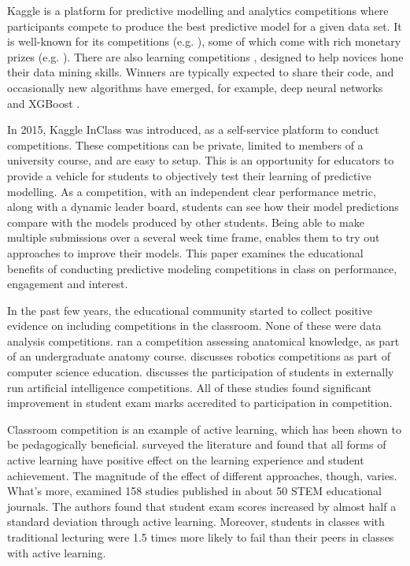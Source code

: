 \documentclass[12pt]{article}
\begin{document}
Kaggle \citep{kaggle} is a platform for predictive modelling and
analytics competitions where participants compete to produce the best
predictive model for a given data set. It is well-known for its
competitions (e.g. \citet{darkmatter}), some of which come with rich
monetary prizes (e.g. \citet{heritage}). There are also learning
competitions \citep{kagglelearn}, designed to help novices hone their
data mining skills. Winners are typically expected to share their code,
and occasionally new algorithms have emerged, for example, deep neural
networks \citep{HintonDahi12} and XGBoost \citep{ChenXGBoost}.

In 2015, Kaggle InClass was introduced, as a self-service platform to
conduct competitions. These competitions can be private, limited to
members of a university course, and are easy to setup. This is an
opportunity for educators to provide a vehicle for students to
objectively test their learning of predictive modelling. As a
competition, with an independent clear performance metric, along with a
dynamic leader board, students can see how their model predictions
compare with the models produced by other students. Being able to make
multiple submissions over a several week time frame, enables them to try
out approaches to improve their models. This paper examines the
educational benefits of conducting predictive modeling competitions in
class on performance, engagement and interest.

In the past few years, the educational community started to collect
positive evidence on including competitions in the classroom. None of
these were data analysis competitions. \citet{VanNuland15} ran a
competition assessing anatomical knowledge, as part of an undergraduate
anatomy course. \citet{Calnon12} discusses robotics competitions as part
of computer science education. \citet{Canada15} discusses the
participation of students in externally run artificial intelligence
competitions. All of these studies found significant improvement in
student exam marks accredited to participation in competition.

Classroom competition is an example of active learning, which has been
shown to be pedagogically beneficial. \citet{Prince04} surveyed the
literature and found that all forms of active learning have positive
effect on the learning experience and student achievement. The magnitude
of the effect of different approaches, though, varies. What's more,
\citet{Freeman14} examined 158 studies published in about 50 STEM
educational journals. The authors found that student exam scores
increased by almost half a standard deviation through active learning.
Moreover, students in classes with traditional lecturing were 1.5 times
more likely to fail than their peers in classes with active learning.
\end{document}
